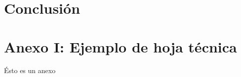 \documentclass[a4paper,12pt,oneside,spanish]{book}
\begin{document}
\backmatter

\chapter{Conclusión}



\appendix
\clearpage
\addappheadtotoc
\appendixpage

\chapter{Anexo I: Ejemplo de hoja técnica}

Ésto es un anexo
\end{document}
